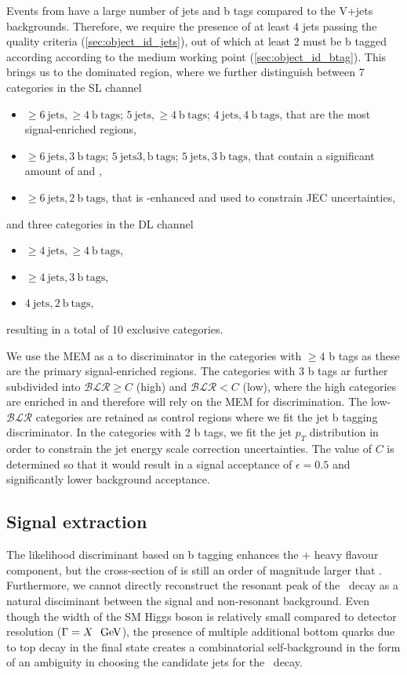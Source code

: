 Events from \ttHbb have a large number of jets and b tags compared to the V+jets backgrounds. Therefore, we require the presence of at least 4 jets passing the quality criteria (\cref{sec:object_id_jets}), out of which at least 2 must be b tagged according according to the medium working point (\cref{sec:object_id_btag}). This brings us to the \ttbar dominated region, where we further distinguish between 7 categories in the SL channel
\begin{itemize}
\item $\ge 6~\mathrm{jets},\ge 4~\mathrm{b~tags}$; $ 5~\mathrm{jets},\ge 4~\mathrm{b~tags}$; $ 4~\mathrm{jets},4~\mathrm{b~tags}$, that are the most signal-enriched regions,
\item $\ge 6~\mathrm{jets},3~\mathrm{b~tags}$; $5~\mathrm{jets} 3,\mathrm{b~tags}$; $5~\mathrm{jets},3~\mathrm{b~tags}$, that contain a significant amount of \ttcc and \ttbb,
\item $\ge 6~\mathrm{jets},2~\mathrm{b~tags}$, that is \ttlf-enhanced and used to constrain JEC uncertainties,
\end{itemize}
and three categories in the DL channel
\begin{itemize}
\item $\ge 4~\mathrm{jets},\ge 4~\mathrm{b~tags}$,
\item $\ge 4~\mathrm{jets},3~\mathrm{b~tags}$,
\item $ 4~\mathrm{jets},2~\mathrm{b~tags}$,
\end{itemize}
resulting in a total of 10 exclusive categories.

We use the MEM as a \ttHbb to \ttbb discriminator in the categories with $\ge 4$ b tags as these are the primary signal-enriched regions. The categories with 3 b tags ar further subdivided into $\mathcal{BLR} \ge C$ (high) and $\mathcal{BLR} < C$ (low), where the high categories are enriched in \ttHbb and therefore will rely on the MEM for discrimination. The low-$\mathcal{BLR}$ categories are retained as control regions where we fit the jet b tagging discriminator. In the categories with 2 b tags, we fit the jet $p_T$ distribution in order to constrain the jet energy scale correction uncertainties. The value of $C$ is determined so that it would result in a signal acceptance of $\epsilon = 0.5$ and significantly lower background acceptance.

\subsection{Signal extraction}
\label{sec:mem_application}
The likelihood discriminant based on b tagging enhances the \ttbar + heavy flavour component, but the cross-section of \ttbb is still an order of magnitude larger that \ttHbb. Furthermore, we cannot directly reconstruct the resonant peak of the \Hbb~decay as a natural disciminant between the signal and non-resonant background. Even though the width of the SM Higgs boson is relatively small compared to detector resolution ($\Gamma = X~~\mathrm{GeV}$), the presence of multiple additional bottom quarks due to top decay in the final state creates a combinatorial self-background in the form of an ambiguity in choosing the candidate jets for the \Hbb~decay.

